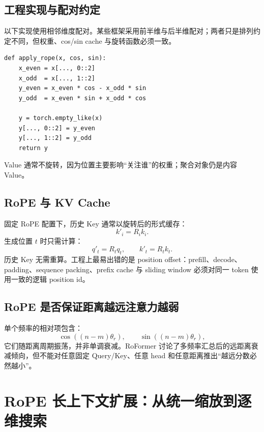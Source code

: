 \documentclass[UTF8,fontset=none,a4paper,10pt]{ctexart}
\begin{document}
\subsection{工程实现与配对约定}

以下实现使用相邻维度配对。某些框架采用前半维与后半维配对；两者只是排列约定不同，但权重、cos/sin cache 与旋转函数必须一致。

\begin{lstlisting}
def apply_rope(x, cos, sin):
    x_even = x[..., 0::2]
    x_odd  = x[..., 1::2]
    y_even = x_even * cos - x_odd * sin
    y_odd  = x_even * sin + x_odd * cos

    y = torch.empty_like(x)
    y[..., 0::2] = y_even
    y[..., 1::2] = y_odd
    return y
\end{lstlisting}

Value 通常不旋转，因为位置主要影响“关注谁”的权重；聚合对象仍是内容 Value。

\subsection{RoPE 与 KV Cache}

固定 RoPE 配置下，历史 Key 通常以旋转后的形式缓存：
\begin{equation}
  k'_i=R_i k_i.
  \label{zh:eq:cached-key}
\end{equation}
生成位置 $t$ 时只需计算：
\begin{equation}
  q'_t=R_tq_t,\qquad k'_t=R_tk_t.
  \label{zh:eq:decode-rope}
\end{equation}
历史 Key 无需重算。工程上最易出错的是 position offset：prefill、decode、padding、sequence packing、prefix cache 与 sliding window 必须对同一 token 使用一致的逻辑 position id。

\subsection{RoPE 是否保证距离越远注意力越弱}

单个频率的相对项包含：
\begin{equation}
  \cos((n-m)\theta_r),\qquad \sin((n-m)\theta_r),
  \label{zh:eq:rope-oscillation}
\end{equation}
它们随距离周期振荡，并非单调衰减。RoFormer 讨论了多频率汇总后的远距离衰减倾向\cite{zh:su2021}，但不能对任意固定 Query/Key、任意 head 和任意距离推出“越远分数必然越小”。

\section{RoPE 长上下文扩展：从统一缩放到逐维搜索}
\end{document}

